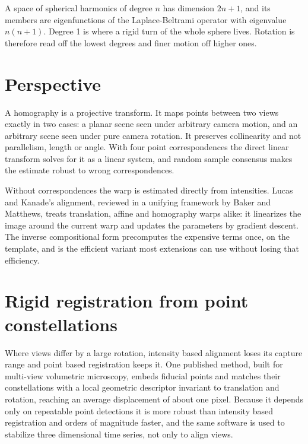 A space of spherical harmonics of degree \(n\) has dimension \(2n+1\), and its members are
eigenfunctions of the Laplace-Beltrami operator with eigenvalue \(n(n+1)\). Degree 1 is where a rigid
turn of the whole sphere lives. Rotation is therefore read off the lowest degrees and finer
motion off higher ones.

\section{Perspective}

A homography is a projective transform. It maps points between two views exactly in two cases: a
planar scene seen under arbitrary camera motion, and an arbitrary scene seen under pure camera
rotation. It preserves collinearity and not parallelism, length or angle. With four point
correspondences the direct linear transform solves for it as a linear system, and random sample
consensus makes the estimate robust to wrong correspondences.

Without correspondences the warp is estimated directly from intensities. Lucas and Kanade's
alignment, reviewed in a unifying framework by Baker and Matthews, treats translation, affine and
homography warps alike: it linearizes the image around the current warp and updates the parameters
by gradient descent. The inverse compositional form precomputes the expensive terms once, on the
template, and is the efficient variant most extensions can use without losing that efficiency.

\section{Rigid registration from point constellations}

Where views differ by a large rotation, intensity based alignment loses its capture range and point
based registration keeps it. One published method, built for multi-view volumetric microscopy,
embeds fiducial points and matches their constellations with a local geometric descriptor invariant
to translation and rotation, reaching an average displacement of about one pixel. Because it depends
only on repeatable point detections it is more robust than intensity based registration and orders of
magnitude faster, and the same software is used to stabilize three dimensional time series, not only
to align views.
